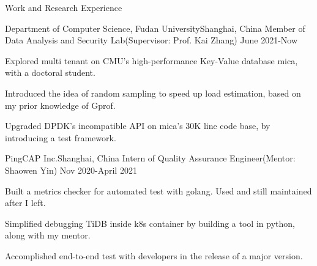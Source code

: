 \documentclass{resume} %
\begin{document}

\begin{rSection}{Work and Research Experience}



\begin{rSubsection}
{Department of Computer Science, Fudan University}{Shanghai, China}
{Member of Data Analysis and Security Lab(Supervisor: Prof. Kai Zhang)} {June 2021-Now}

\item Explored multi tenant on CMU's high-performance Key-Value database mica, with a doctoral student.
\item Introduced the idea of random sampling to speed up load estimation, based on my prior knowledge of Gprof.
\item Upgraded DPDK's incompatible API on mica's 30K line code base, by introducing a test framework.

\end{rSubsection}


\begin{rSubsection}
{PingCAP Inc.}{Shanghai, China}
{Intern of Quality Assurance Engineer(Mentor: Shaowen Yin)} {Nov 2020-April 2021}

\item Built a metrics checker for automated test with golang. Used and still maintained after I left.

\item Simplified debugging TiDB inside k8s container by building a tool in python, along with my mentor.

\item Accomplished end-to-end test with developers in the release of a major version.


\end{rSubsection}



\end{rSection}
\end{document}
